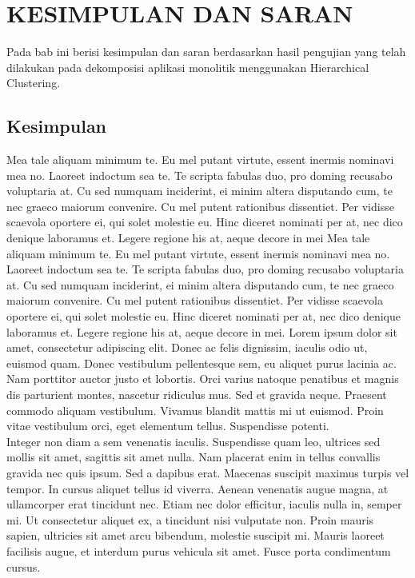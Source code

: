 \chapter{KESIMPULAN DAN SARAN}

\vspace{4.5pt}

Pada bab ini berisi kesimpulan dan saran berdasarkan hasil pengujian yang telah dilakukan pada dekomposisi aplikasi monolitik menggunakan Hierarchical Clustering.  

\section{Kesimpulan}
Mea tale aliquam minimum te. Eu mel putant virtute, essent inermis nominavi mea no. Laoreet indoctum sea te. Te scripta fabulas duo, pro doming recusabo voluptaria at. Cu sed numquam inciderint, ei minim altera disputando cum, te nec graeco maiorum convenire.
Cu mel putent rationibus dissentiet. Per vidisse scaevola oportere ei, qui solet molestie eu. Hinc diceret nominati per at, nec dico denique laboramus et. Legere regione his at, aeque decore in mei
Mea tale aliquam minimum te. Eu mel putant virtute, essent inermis nominavi mea no. Laoreet indoctum sea te. Te scripta fabulas duo, pro doming recusabo voluptaria at. Cu sed numquam inciderint, ei minim altera disputando cum, te nec graeco maiorum convenire.
Cu mel putent rationibus dissentiet. Per vidisse scaevola oportere ei, qui solet molestie eu. Hinc diceret nominati per at, nec dico denique laboramus et. Legere regione his at, aeque decore in mei.
Lorem ipsum dolor sit amet, consectetur adipiscing elit. Donec ac felis dignissim, iaculis odio ut, euismod quam. Donec vestibulum pellentesque sem, eu aliquet purus lacinia ac. Nam porttitor auctor justo et lobortis. Orci varius natoque penatibus et magnis dis parturient montes, nascetur ridiculus mus. Sed et gravida neque. Praesent commodo aliquam vestibulum. Vivamus blandit mattis mi ut euismod. Proin vitae vestibulum orci, eget elementum tellus. Suspendisse potenti.\\

Integer non diam a sem venenatis iaculis. Suspendisse quam leo, ultrices sed mollis sit amet, sagittis sit amet nulla. Nam placerat enim in tellus convallis gravida nec quis ipsum. Sed a dapibus erat. Maecenas suscipit maximus turpis vel tempor. In cursus aliquet tellus id viverra. Aenean venenatis augue magna, at ullamcorper erat tincidunt nec. Etiam nec dolor efficitur, iaculis nulla in, semper mi. Ut consectetur aliquet ex, a tincidunt nisi vulputate non. Proin mauris sapien, ultricies sit amet arcu bibendum, molestie suscipit mi. Mauris laoreet facilisis augue, et interdum purus vehicula sit amet. Fusce porta condimentum cursus.\\

